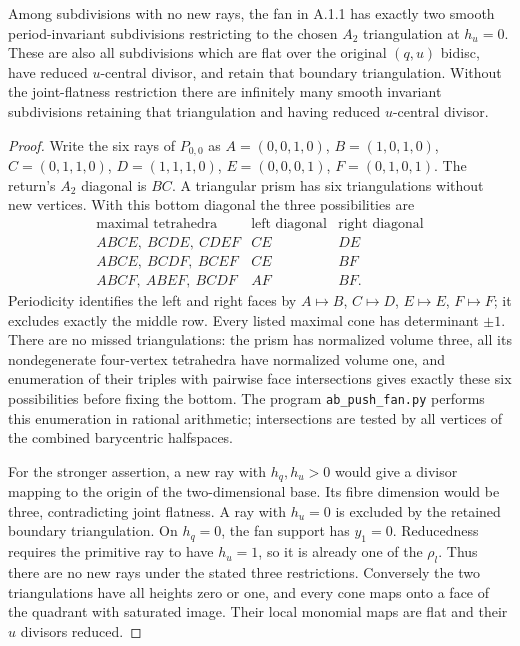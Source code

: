 \begin{proposition}\label{push:src:A.2.1}\label{push:A21}
Among subdivisions with no new rays, the fan in A.1.1 has exactly
two smooth period-invariant subdivisions restricting to the chosen
$A_2$ triangulation at $h_u=0$. These are also all subdivisions
which are flat over the original $(q,u)$ bidisc, have reduced
$u$-central divisor, and retain that boundary triangulation.
Without the joint-flatness restriction there are infinitely many
smooth invariant subdivisions retaining that triangulation and
having reduced $u$-central divisor.
\end{proposition}
\begin{proof}
Write the six rays of $P_{0,0}$ as
$A=(0,0,1,0)$, $B=(1,0,1,0)$, $C=(0,1,1,0)$,
$D=(1,1,1,0)$, $E=(0,0,0,1)$, $F=(0,1,0,1)$.
The return's $A_2$ diagonal is $BC$. A triangular prism has six
triangulations without new vertices. With this bottom diagonal
the three possibilities are
\[
\begin{array}{c|c|c}
\text{maximal tetrahedra}&\text{left diagonal}&\text{right diagonal}\\\hline
ABCE,\ BCDE,\ CDEF&CE&DE\\
ABCE,\ BCDF,\ BCEF&CE&BF\\
ABCF,\ ABEF,\ BCDF&AF&BF.
\end{array}
\]
Periodicity identifies the left and right faces by $A\mapsto B$,
$C\mapsto D$, $E\mapsto E$, $F\mapsto F$; it excludes exactly
the middle row. Every listed maximal cone has determinant $\pm1$.
There are no missed triangulations: the prism has normalized volume
three, all its nondegenerate four-vertex tetrahedra have normalized
volume one, and enumeration of their triples with pairwise
face intersections gives exactly these six possibilities before
fixing the bottom. The program \texttt{ab\_push\_fan.py} performs
this enumeration in rational arithmetic; intersections are tested
by all vertices of the combined barycentric halfspaces.

For the stronger assertion, a new ray with $h_q,h_u>0$ would
give a divisor mapping to the origin of the two-dimensional base.
Its fibre dimension would be three, contradicting joint flatness.
A ray with $h_u=0$ is excluded by the retained boundary
triangulation. On $h_q=0$, the fan support has $y_1=0$.
Reducedness requires the primitive ray to have $h_u=1$, so it
is already one of the $\rho_l$. Thus there are no new rays under
the stated three restrictions. Conversely the two triangulations
have all heights zero or one, and every cone maps onto a face of
the quadrant with saturated image. Their local monomial maps
are flat and their $u$ divisors reduced.


\end{proof}

